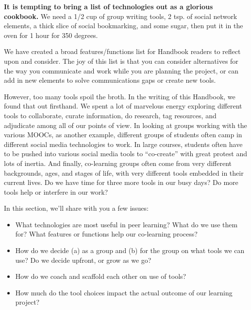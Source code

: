 \textbf{It is tempting to bring a list of technologies out as a glorious
cookbook.} We need a 1/2 cup of group writing tools, 2 tsp. of social
network elements, a thick slice of social bookmarking, and some sugar,
then put it in the oven for 1 hour for 350 degrees.

We have created a broad features/functions list for Handbook readers to
reflect upon and consider. The joy of this list is that you can consider
alternatives for the way you communicate and work while you are planning
the project, or can add in new elements to solve communications gaps or
create new tools.

However, too many tools spoil the broth. In the writing of this
Handbook, we found that out firsthand. We spent a lot of marvelous
energy exploring different tools to collaborate, curate information, do
research, tag resources, and adjudicate among all of our points of view.
In looking at groups working with the various MOOCs, as another example,
different groups of students often camp in different social media
technologies to work. In large courses, students often have to be pushed
into various social media tools to ``co-create'' with great protest and
lots of inertia. And finally, co-learning groups often come from very
different backgrounds, ages, and stages of life, with very different
tools embedded in their current lives. Do we have time for three more
tools in our busy days? Do more tools help or interfere in our work?

In this section, we'll share with you a few issues:

\begin{itemize}
\item
  What technologies are most useful in peer learning? What do we use
  them for? What features or functions help our co-learning process?
\end{itemize}

\begin{itemize}
\item
  How do we decide (a) as a group and (b) for the group on what tools we
  can use? Do we decide upfront, or grow as we go?
\end{itemize}

\begin{itemize}
\item
  How do we coach and scaffold each other on use of tools?
\end{itemize}

\begin{itemize}
\item
  How much do the tool choices impact the actual outcome of our learning
  project?
\end{itemize}

